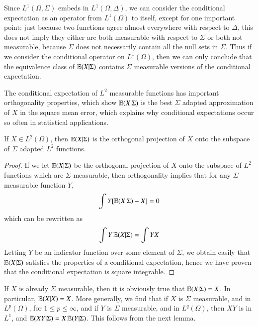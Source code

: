 Since $L^1(\Omega, \Sigma)$ embeds in $L^1(\Omega, \Delta)$, we can consider the conditional expectation as an operator from $L^1(\Omega)$ to itself, except for one important point: just because two functions agree almost everywhere with respect to $\Delta$, this does not imply they either are both measurable with respect to $\Sigma$ or both not measurable, because $\Sigma$ does not necessarily contain all the null sets in $\Sigma$. Thus if we consider the conditional operator on $L^1(\Omega)$, then we can only conclude that the equivalence class of $\operatorname{\mathbb{E}}(X|\Sigma)$ contains $\Sigma$ measurable versions of the conditional expectation.

The conditional expectation of $L^2$ measurable functions has important orthogonality properties, which show $\operatorname{\mathbb{E}}(X|\Sigma)$ is the best $\Sigma$ adapted approximation of $X$ in the square mean error, which explains why conditional expectations occur so often in statistical applications.

\begin{theorem}
    If $X \in L^2(\Omega)$, then $\operatorname{\mathbb{E}}(X|\Sigma)$ is the orthogonal projection of $X$ onto the subspace of $\Sigma$ adapted $L^2$ functions.
\end{theorem}
\begin{proof}
    If we let $\operatorname{\mathbb{E}}(X|\Sigma)$ be the orthogonal projection of $X$ onto the subspace of $L^2$ functions which are $\Sigma$ measurable, then orthogonality implies that for any $\Sigma$ measurable function $Y$,
    \[ \int Y[\operatorname{\mathbb{E}}(X|\Sigma) - X] = 0 \]
    which can be rewritten as
    \[ \int Y \operatorname{\mathbb{E}}(X|\Sigma) = \int YX \]
    Letting $Y$ be an indicator function over some element of $\Sigma$, we obtain easily that $\operatorname{\mathbb{E}}(X|\Sigma)$ satisfies the properties of a conditional expectation, hence we have proven that the conditional expectation is square integrable.
\end{proof}

If $X$ is already $\Sigma$ measurable, then it is obviously true that $\operatorname{\mathbb{E}}(X|\Sigma) = X$. In particular, $\operatorname{\mathbb{E}}(X|X) = X$. More generally, we find that if $X$ is $\Sigma$ measurable, and in $L^p(\Omega)$, for $1 \leq p \leq \infty$, and if $Y$ is $\Sigma$ measurable, and in $L^q(\Omega)$, then $XY$ is in $L^1$, and $\operatorname{\mathbb{E}}(XY|\Sigma) = X\operatorname{\mathbb{E}}(Y|\Sigma)$. This follows from the next lemma.

